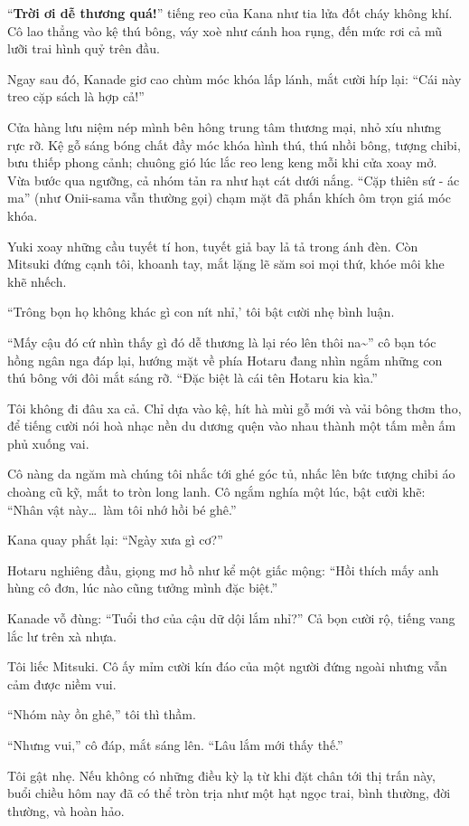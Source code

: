 \documentclass[../main.tex]{subfiles}
\begin{document}
``\textbf{Trời ơi dễ thương quá!}'' tiếng reo của Kana như tia lửa đốt cháy không khí. Cô lao thẳng vào kệ thú bông, váy xoè như cánh hoa rụng, đến mức rơi cả mũ lưỡi trai hình quỷ trên đầu.

Ngay sau đó, Kanade giơ cao chùm móc khóa lấp lánh, mắt cười híp lại: ``Cái này treo cặp sách là hợp cả!''

Cửa hàng lưu niệm nép mình bên hông trung tâm thương mại, nhỏ xíu nhưng rực rỡ. Kệ gỗ sáng bóng chất đầy móc khóa hình thú, thú nhồi bông, tượng chibi, bưu thiếp phong cảnh; chuông gió lúc lắc reo leng keng mỗi khi cửa xoay mở. Vừa bước qua ngưỡng, cả nhóm tản ra như hạt cát dưới nắng. ``Cặp thiên sứ - ác ma'' (như Onii-sama vẫn thường gọi) chạm mặt đã phấn khích ôm trọn giá móc khóa.

Yuki xoay những cầu tuyết tí hon, tuyết giả bay lả tả trong ánh đèn. Còn Mitsuki đứng cạnh tôi, khoanh tay, mắt lặng lẽ săm soi mọi thứ, khóe môi khe khẽ nhếch.

``Trông bọn họ không khác gì con nít nhỉ,' tôi bật cười nhẹ bình luận.

``Mấy cậu đó cứ nhìn thấy gì đó dễ thương là lại réo lên thôi na\~{}'' cô bạn tóc hồng ngân nga đáp lại, hướng mặt về phía Hotaru đang nhìn ngắm những con thú bông với đôi mắt sáng rỡ. ``Đặc biệt là cái tên Hotaru kia kìa.''

Tôi không đi đâu xa cả. Chỉ dựa vào kệ, hít hà mùi gỗ mới và vải bông thơm tho, để tiếng cười nói hoà nhạc nền du dương quện vào nhau thành một tấm mền ấm phủ xuống vai.

Cô nàng da ngăm mà chúng tôi nhắc tới ghé góc tủ, nhấc lên bức tượng chibi áo choàng cũ kỹ, mắt to tròn long lanh. Cô ngắm nghía một lúc, bật cười khẽ: ``Nhân vật này\dots\ làm tôi nhớ hồi bé ghê.''

Kana quay phắt lại: ``Ngày xưa gì cơ?''

Hotaru nghiêng đầu, giọng mơ hồ như kể một giấc mộng: ``Hồi thích mấy anh hùng cô đơn, lúc nào cũng tưởng mình đặc biệt.''

Kanade vỗ đùng: ``Tuổi thơ của cậu dữ dội lắm nhỉ?'' Cả bọn cười rộ, tiếng vang lắc lư trên xà nhựa.

Tôi liếc Mitsuki. Cô ấy mỉm cười kín đáo của một người đứng ngoài nhưng vẫn cảm được niềm vui.

``Nhóm này ồn ghê,'' tôi thì thầm.

``Nhưng vui,'' cô đáp, mắt sáng lên. ``Lâu lắm mới thấy thế.''

Tôi gật nhẹ. Nếu không có những điều kỳ lạ từ khi đặt chân tới thị trấn này, buổi chiều hôm nay đã có thể tròn trịa như một hạt ngọc trai, bình thường, đời thường, và hoàn hảo.
\end{document}

